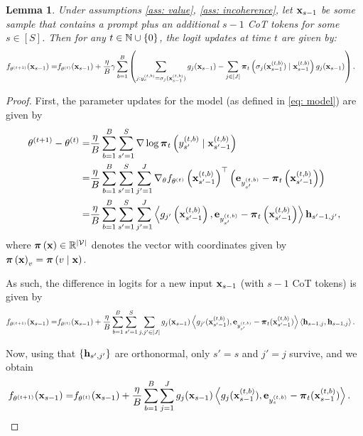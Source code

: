 \documentclass{article}
\theoremstyle{plain}
\newtheorem{lemma}[theorem]{Lemma}
\theoremstyle{definition}
\theoremstyle{remark}
\begin{document}
\begin{lemma}\label{lem: logit_updates_raw}
    Under assumptions \ref{ass: value}, \ref{ass: incoherence}, let $ \mathbf{x}_{s-1}$ be some sample that contains a prompt plus an additional $s-1$ CoT tokens for some $s\in[S]$. Then for any $t\in \mathbb{N}\cup\{0\}$, the logit updates at time $t$ are given by:
    \begin{align}\label{eq: logit_updates}
        f_{\theta^{(t+1)}}( \mathbf{x}_{s-1}) = & f_{\theta^{(t)}}( \mathbf{x}_{s-1}) + \frac{\eta}{B} \gamma \sum_{b=1}^B \left(\sum_{j :  y_{s}^{(t, b)} = \sigma_j(\mathbf{x}_{s-1}^{(t, b)}) } g_j( \mathbf{x}_{s-1}) - \sum_{j \in [J]} \boldsymbol{\pi}_t\left(\sigma_j(\mathbf{x}_{s-1}^{(t, b)}) \mid \mathbf{x}_{s-1}^{(t, b)}\right) g_j( \mathbf{x}_{s-1}) \right).
    \end{align}
\end{lemma}
\begin{proof}
    First, the parameter updates for the model (as defined in \eqref{eq: model}) are given by
    \begin{align*}
        \theta^{(t+1)} - \theta^{(t)}= & \frac{\eta}{B} \sum_{b=1}^B \sum_{s'=1}^S\nabla \log \boldsymbol{\pi}_{t}\left(y_{s'}^{(t, b)} \mid \mathbf{x}_{s'-1}^{(t, b)}\right) \\ 
        = & \frac{\eta}{B} \sum_{b=1}^B \sum_{s'=1}^S \sum_{j'=1}^J \nabla_\theta f_{\theta^{(t)}}\left( \mathbf{x}_{s'-1}^{(t, b)} \right)^\top \left(\mathbf{e}_{y_{s'}^{(t, b)}} - \boldsymbol{\pi}_t \left(\mathbf{x}_{s'-1}^{(t, b)}\right)\right) \\
        = & \frac{\eta}{B} \sum_{b=1}^B \sum_{s'=1}^S \sum_{j'=1}^J \left\langle g_{j'}\left(\mathbf{x}_{s'-1}^{(t, b)}\right), \mathbf{e}_{y_{s'}^{(t, b)}} - \boldsymbol{\pi}_t \left(\mathbf{x}_{s'-1}^{(t, b)}\right)\right\rangle \mathbf{h}_{s'-1, j'},
    \end{align*}
     where $\boldsymbol{\pi}\left(\mathbf{x}\right) \in \mathbb{R}^{\left| \mathcal{V} \right|}$ denotes the vector with coordinates given by $\boldsymbol{\pi}\left(\mathbf{x} \right)_v = \boldsymbol{\pi}\left(v \mid \mathbf{x}\right)$.
    
    As such, the difference in logits for a new input $\mathbf{x}_{s-1}$ (with $s-1$ CoT tokens) is given by
    \begin{align*}
        f_{\theta^{(t+1)}}( \mathbf{x}_{s-1}) = & f_{\theta^{(t)}}( \mathbf{x}_{s-1}) + \frac{\eta}{B} \sum_{b=1}^B\sum_{s'=1}^S \sum_{j, j' \in [J]} g_j( \mathbf{x}_{s-1}) \left\langle g_{j'}(\mathbf{x}_{s'-1}^{(t, b)}), \mathbf{e}_{y_{s'}^{(t, b)}} - \boldsymbol{\pi}_t (\mathbf{x}_{s'-1}^{(t, b)}) \right\rangle \left\langle \mathbf{h}_{s-1, j}, \mathbf{h}_{s-1, j} \right\rangle.  
    \end{align*}

    Now, using that $\{\mathbf{h}_{s',j'}\}$ are orthonormal, only $s'=s$ and $j'=j$ survive, and we obtain
    \begin{align*}
        f_{\theta^{(t+1)}}( \mathbf{x}_{s-1}) = & f_{\theta^{(t)}}( \mathbf{x}_{s-1}) + \frac{\eta}{B} \sum_{b=1}^B\sum_{j=1}^J g_j( \mathbf{x}_{s-1}) \left\langle g_j(\mathbf{x}_{s-1}^{(t, b)}), \mathbf{e}_{y_{s}^{(t, b)}} - \boldsymbol{\pi}_t (\mathbf{x}_{s-1}^{(t, b)}) \right\rangle. 
    \end{align*}
    

\end{proof}
\end{document}
